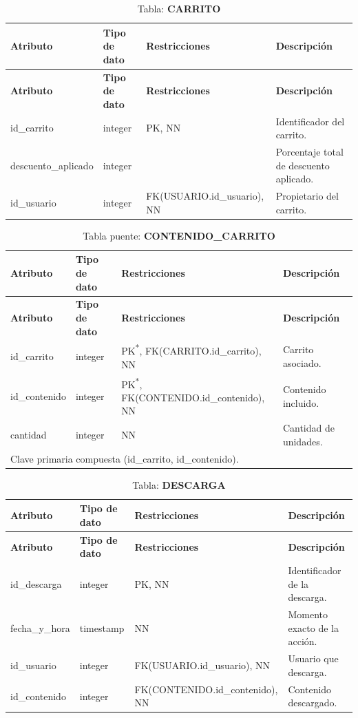 \begin{longtable}{|l|l|p{5cm}|p{5cm}|}
\caption{Tabla: \textbf{CARRITO}}\\ \hline
\textbf{Atributo} & \textbf{Tipo de dato} & \textbf{Restricciones} & \textbf{Descripción} \\ \hline
\endfirsthead
\hline \textbf{Atributo} & \textbf{Tipo de dato} & \textbf{Restricciones} & \textbf{Descripción} \\ \hline
\endhead
id\_carrito        & integer & PK, NN & Identificador del carrito. \\ \hline
descuento\_aplicado& integer &        & Porcentaje total de descuento aplicado. \\ \hline
id\_usuario        & integer & FK(USUARIO.id\_usuario), NN & Propietario del carrito. \\ \hline
\end{longtable}

\newpage
\begin{longtable}{|l|l|p{5cm}|p{5cm}|}
\caption{Tabla puente: \textbf{CONTENIDO\_CARRITO}}\\ \hline
\textbf{Atributo} & \textbf{Tipo de dato} & \textbf{Restricciones} & \textbf{Descripción} \\ \hline
\endfirsthead
\hline \textbf{Atributo} & \textbf{Tipo de dato} & \textbf{Restricciones} & \textbf{Descripción} \\ \hline
\endhead
id\_carrito   & integer & PK\textsuperscript{*}, FK(CARRITO.id\_carrito), NN & Carrito asociado. \\ \hline
id\_contenido & integer & PK\textsuperscript{*}, FK(CONTENIDO.id\_contenido), NN & Contenido incluido. \\ \hline
cantidad      & integer & NN & Cantidad de unidades. \\ \hline
\multicolumn{4}{l}{\footnotesize * Clave primaria compuesta (id\_carrito, id\_contenido).} \\
\end{longtable}

\begin{longtable}{|l|l|p{5cm}|p{5cm}|}
\caption{Tabla: \textbf{DESCARGA}}\\ \hline
\textbf{Atributo} & \textbf{Tipo de dato} & \textbf{Restricciones} & \textbf{Descripción} \\ \hline
\endfirsthead
\hline \textbf{Atributo} & \textbf{Tipo de dato} & \textbf{Restricciones} & \textbf{Descripción} \\ \hline
\endhead
id\_descarga  & integer   & PK, NN & Identificador de la descarga. \\ \hline
fecha\_y\_hora& timestamp & NN & Momento exacto de la acción. \\ \hline
id\_usuario   & integer   & FK(USUARIO.id\_usuario), NN & Usuario que descarga. \\ \hline
id\_contenido & integer   & FK(CONTENIDO.id\_contenido), NN & Contenido descargado. \\ \hline
\end{longtable}

